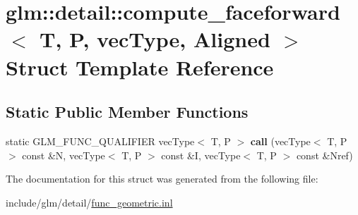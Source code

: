 \hypertarget{structglm_1_1detail_1_1compute__faceforward}{}\section{glm\+:\+:detail\+:\+:compute\+\_\+faceforward$<$ T, P, vec\+Type, Aligned $>$ Struct Template Reference}
\label{structglm_1_1detail_1_1compute__faceforward}
\subsection*{Static Public Member Functions}
\begin{DoxyCompactItemize}
\item 
\mbox{\label{structglm_1_1detail_1_1compute__faceforward_a87e2bbf8af0c5f6945c4fa54a9d0856d}} 
static G\+L\+M\+\_\+\+F\+U\+N\+C\+\_\+\+Q\+U\+A\+L\+I\+F\+I\+ER vec\+Type$<$ T, P $>$ {\bfseries call} (vec\+Type$<$ T, P $>$ const \&N, vec\+Type$<$ T, P $>$ const \&I, vec\+Type$<$ T, P $>$ const \&Nref)
\end{DoxyCompactItemize}


The documentation for this struct was generated from the following file\+:\begin{DoxyCompactItemize}
\item 
include/glm/detail/\hyperlink{func__geometric_8inl}{func\+\_\+geometric.\+inl}\end{DoxyCompactItemize}
